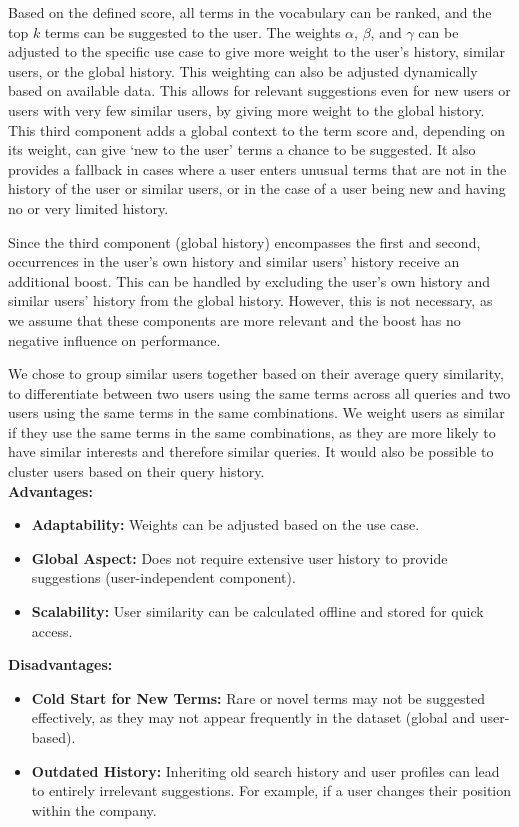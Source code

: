 Based on the defined score, all terms in the vocabulary can be ranked, and the top $k$ terms can be suggested to the user. The weights $\alpha$, $\beta$, and $\gamma$ can be adjusted to the specific use case to give more weight to the user's history, similar users, or the global history. This weighting can also be adjusted dynamically based on available data. This allows for relevant suggestions even for new users or users with very few similar users, by giving more weight to the global history. This third component adds a global context to the term score and, depending on its weight, can give `new to the user' terms a chance to be suggested. It also provides a fallback in cases where a user enters unusual terms that are not in the history of the user or similar users, or in the case of a user being new and having no or very limited history.

Since the third component (global history) encompasses the first and second, occurrences in the user's own history and similar users' history receive an additional boost. This can be handled by excluding the user's own history and similar users' history from the global history. However, this is not necessary, as we assume that these components are more relevant and the boost has no negative influence on performance.

We chose to group similar users together based on their average query similarity, to differentiate between two users using the same terms across all queries and two users using the same terms in the same combinations. We weight users as similar if they use the same terms in the same combinations, as they are more likely to have similar interests and therefore similar queries. It would also be possible to cluster users based on their query history.\\

\textbf{Advantages:}
\begin{itemize}
    \item \textbf{Adaptability:} Weights can be adjusted based on the use case.
    \item \textbf{Global Aspect:} Does not require extensive user history to provide suggestions (user-independent component).
    \item \textbf{Scalability:} User similarity can be calculated offline and stored for quick access.
\end{itemize}

\textbf{Disadvantages:}
\begin{itemize}
    \item \textbf{Cold Start for New Terms:} Rare or novel terms may not be suggested effectively, as they may not appear frequently in the dataset (global and user-based).
    \item \textbf{Outdated History:} Inheriting old search history and user profiles can lead to entirely irrelevant suggestions. For example, if a user changes their position within the company.
\end{itemize}
